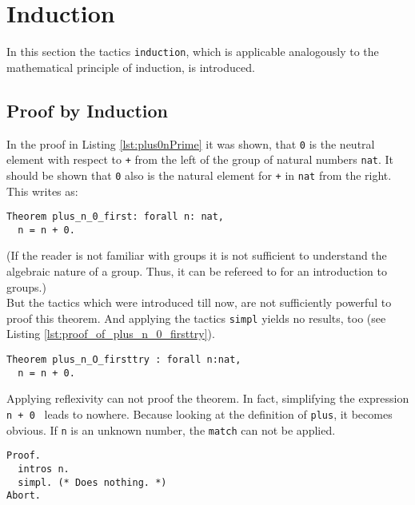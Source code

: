 \section{Induction}
\label{sec:Induction}

In this section the tactics \lstinline!induction!, which is applicable analogously to the mathematical principle of induction, is introduced.

\subsection{Proof by Induction}
\label{sec:ProofByInduction}

In the proof in Listing \ref{lst:plus0nPrime} it was shown, 
that \lstinline!0! is the neutral element with respect to \lstinline!+! from the left of the group of natural numbers \lstinline!nat!. 
It should be shown that \lstinline!0! also is the natural element for \lstinline!+! in \lstinline!nat! from the right. 
This writes as:
\begin{lstlisting}[caption = \lstinline!plus_n_0_first!, label= lst:plus_n_0_first]
Theorem plus_n_0_first: forall n: nat,
  n = n + 0.  
\end{lstlisting}
(If the reader is not familiar with groups it is not sufficient to understand the algebraic nature of a group.
 Thus, it can be refereed to \cite{S} for an introduction to groups.)\\
But the tactics which were introduced till now, are not sufficiently powerful to proof this theorem.
And applying the tactics \lstinline!simpl! yields no results, too (see Listing \ref{lst:proof_of_plus_n_0_firsttry}).
\begin{lstlisting}[caption = \lstinline!plus_n_O_firsttry!, label=lst:plus_n_0_firsttry] 
Theorem plus_n_O_firsttry : forall n:nat,
  n = n + 0.
\end{lstlisting}

Applying reflexivity can not proof the theorem. In fact, simplifying the expression \lstinline!n + 0 ! leads to nowhere.
Because looking at the definition of \lstinline!plus!, it becomes obvious.
If \lstinline!n! is an unknown number, the \lstinline!match! can not be applied.
  
\begin{lstlisting}[caption= \lstinline!Proof! of \lstinline!plus_n_0_firsttry!, label = lst:proof_of_plus_n_0_firsttry]
Proof.
  intros n.
  simpl. (* Does nothing. *)
Abort.
\end{lstlisting}

